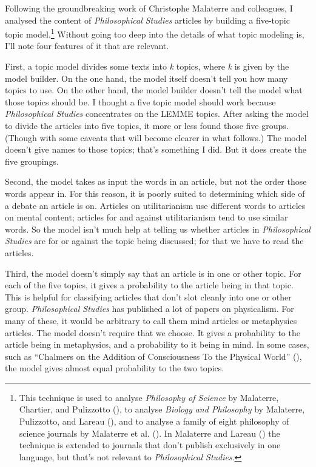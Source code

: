 \documentclass[
  11pt,
  letterpaper,
  DIV=11,
  numbers=noendperiod,
  twoside]{scrartcl}
\begin{document}
Following the groundbreaking work of Christophe Malaterre and
colleagues, I analysed the content of \emph{Philosophical Studies}
articles by building a five-topic topic model.\footnote{This technique
  is used to analyse \emph{Philosophy of Science} by Malaterre,
  Chartier, and Pulizzotto (), to
  analyse \emph{Biology and Philosophy} by Malaterre, Pulizzotto, and
  Lareau (), and to analyse a family
  of eight philosophy of science journals by Malaterre et al.
  (). In Malaterre and Lareau
  () the technique is extended to
  journals that don't publish exclusively in one language, but that's
  not relevant to \emph{Philosophical Studies}.} Without going too deep
into the details of what topic modeling is, I'll note four features of
it that are relevant.

First, a topic model divides some texts into \emph{k} topics, where
\emph{k} is given by the model builder. On the one hand, the model
itself doesn't tell you how many topics to use. On the other hand, the
model builder doesn't tell the model what those topics should be. I
thought a five topic model should work because \emph{Philosophical
Studies} concentrates on the LEMME topics. After asking the model to
divide the articles into five topics, it more or less found those five
groups. (Though with some caveats that will become clearer in what
follows.) The model doesn't give names to those topics; that's something
I did. But it does create the five groupings.

Second, the model takes as input the words in an article, but not the
order those words appear in. For this reason, it is poorly suited to
determining which side of a debate an article is on. Articles on
utilitarianism use different words to articles on mental content;
articles for and against utilitarianism tend to use similar words. So
the model isn't much help at telling us whether articles in
\emph{Philosophical Studies} are for or against the topic being
discussed; for that we have to read the articles.

Third, the model doesn't simply say that an article is in one or other
topic. For each of the five topics, it gives a probability to the
article being in that topic. This is helpful for classifying articles
that don't slot cleanly into one or other group. \emph{Philosophical
Studies} has published a lot of papers on physicalism. For many of
these, it would be arbitrary to call them mind articles or metaphysics
articles. The model doesn't require that we choose. It gives a
probability to the article being in metaphysics, and a probability to it
being in mind. In some cases, such as ``Chalmers on the Addition of
Consciousness To the Physical World''
(), the model gives almost
equal probability to the two topics.
\end{document}
